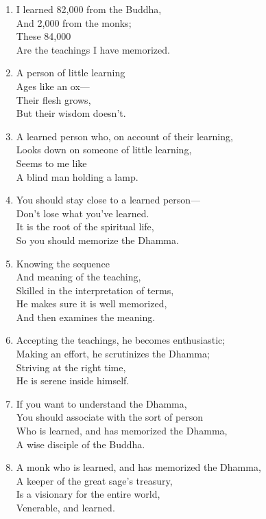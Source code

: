 \documentclass[10pt, openany]{book}
\begin{document}
\begin{enumerate}
\item I learned 82,000 from the Buddha,\\
And 2,000 from the monks;\\
These 84,000\\
Are the teachings I have memorized.

\item A person of little learning\\
Ages like an ox—\\
Their flesh grows,\\
But their wisdom doesn’t.

\item A learned person who, on account of their learning,\\
Looks down on someone of little learning,\\
Seems to me like\\
A blind man holding a lamp.

\item You should stay close to a learned person—\\
Don’t lose what you’ve learned.\\
It is the root of the spiritual life,\\
So you should memorize the Dhamma.

\item Knowing the sequence \\
And meaning of the teaching,\\
Skilled in the interpretation of terms,\\
He makes sure it is well memorized,\\
And then examines the meaning.

\item Accepting the teachings, he becomes enthusiastic;\\
Making an effort, he scrutinizes the Dhamma;\\
Striving at the right time,\\
He is serene inside himself.

\item If you want to understand the Dhamma,\\
You should associate with the sort of person\\
Who is learned, and has memorized the Dhamma,\\
A wise disciple of the Buddha.

\item A monk who is learned, and has memorized the Dhamma,\\
A keeper of the great sage’s treasury,\\
Is a visionary for the entire world,\\
Venerable, and learned.


\end{enumerate}
\end{document}
